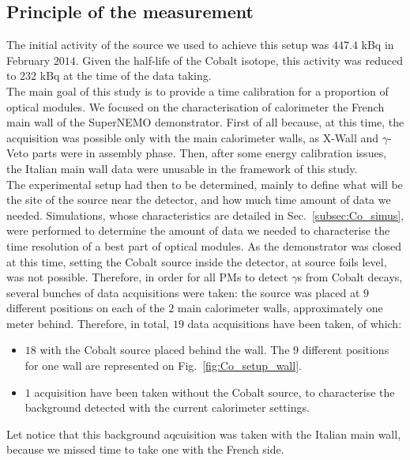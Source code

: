 
\subsection{Principle of the measurement}
\label{subsec:Co_setup}

The initial activity of the source we used to achieve this setup was $447.4$ kBq in February $2014$.
Given the half-life of the Cobalt isotope, this activity was reduced to $232$ kBq at the time of the data taking.\\
\newline
The main goal of this study is to provide a time calibration for a proportion of optical modules.
We focused on the characterisation of calorimeter the French main wall of the SuperNEMO demonstrator.
First of all because, at this time, the acquisition was possible only with the main calorimeter walls, as X-Wall and $\gamma$-Veto parts were in assembly phase.
Then, after some energy calibration issues, the Italian main wall data were unusable in the framework of this study.\\
\newline
The experimental setup had then to be determined, mainly to define what will be the site of the source near the detector, and how much time amount of data we needed.
Simulations, whose characteristics are detailed in Sec.~\ref{subsec:Co_simus}, were performed to determine the amount of data we needed to characterise the time resolution of a best part of optical modules.
As the demonstrator was closed at this time, setting the Cobalt source inside the detector, at source foils level, was not possible.
Therefore, in order for all PMs to detect $\gamma$s from Cobalt decays, several bunches of data acquisitions were taken:
the source was placed at $9$ different positions on each of the $2$ main calorimeter walls, approximately one meter behind.
Therefore,  in total, $19$ data acquisitions have been taken, of which:
\begin{itemize}
\item $18$ with the Cobalt source placed behind the wall. The $9$ different positions for one wall are represented on Fig.~\ref{fig:Co_setup_wall}.
\item $1$ acquisition have been taken without the Cobalt source, to characterise the background detected with the current calorimeter settings.
\end{itemize}
Let notice that this background aqcuisition was taken with the Italian main wall, because we missed time to take one with the French side.
